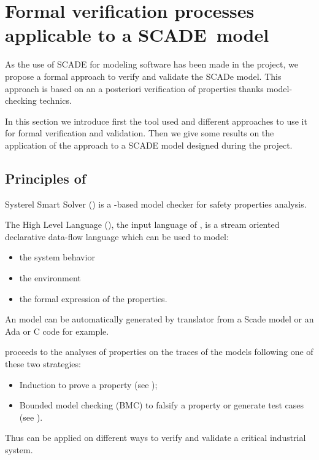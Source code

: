 \section{Formal verification processes applicable to a SCADE~model}

As the use of SCADE for modeling software has been made in the project, we propose a formal approach to  verify and validate the SCADe model.
This approach is based on  an a posteriori verification of properties thanks  model-checking technics.

In this section we introduce first the tool used and  different approaches to use it for formal verification and validation. Then we give some results on the application of the approach to a SCADE model designed during the project.

\subsection{Principles of \smartsolver{}}

Systerel Smart Solver (\smartsolver{}) is a  \SAT{}-based
model checker for safety properties analysis. 

The High Level Language (\HLL{}), the input language of \smartsolver{}, is a stream oriented declarative data-flow language which can be used to  model:

\begin{itemize}
\item the system behavior
\item the environment
\item the formal expression of the properties.
\end{itemize}

An \HLL{} model can be automatically generated by translator from a Scade model or an Ada or C code for example.

\smartsolver{} proceeds to  the analyses of properties on the traces of the \HLL{} models following one of these two strategies:
\begin{itemize}
\item Induction to prove a property (see \cite{Sheeran:2000});
\item Bounded model checking (BMC) to falsify a property or generate test cases (see \cite{Biere:1999,Amla:2005}).
\end{itemize}

Thus \smartsolver{} can be applied on different ways to  verify and validate a critical industrial  system.


